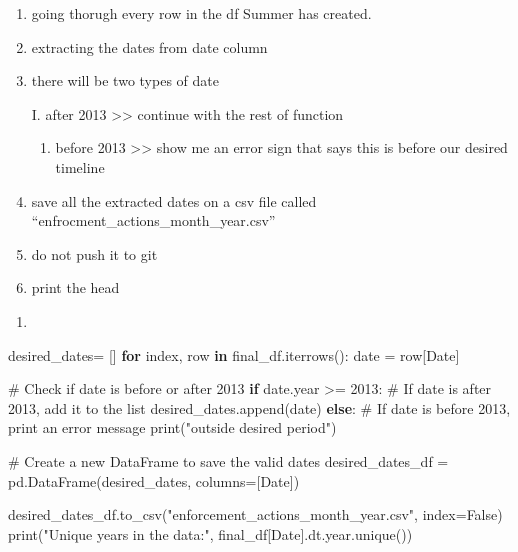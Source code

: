 \documentclass[
  letterpaper,
  DIV=11,
  numbers=noendperiod]{scrartcl}
\newenvironment{Shaded}{\begin{snugshade}}{\end{snugshade}}
\newcommand{\BuiltInTok}[1]{\textcolor[rgb]{0.00,0.23,0.31}{#1}}
\newcommand{\CommentTok}[1]{\textcolor[rgb]{0.37,0.37,0.37}{#1}}
\newcommand{\ControlFlowTok}[1]{\textcolor[rgb]{0.00,0.23,0.31}{\textbf{#1}}}
\newcommand{\DecValTok}[1]{\textcolor[rgb]{0.68,0.00,0.00}{#1}}
\newcommand{\KeywordTok}[1]{\textcolor[rgb]{0.00,0.23,0.31}{\textbf{#1}}}
\newcommand{\NormalTok}[1]{\textcolor[rgb]{0.00,0.23,0.31}{#1}}
\newcommand{\OperatorTok}[1]{\textcolor[rgb]{0.37,0.37,0.37}{#1}}
\newcommand{\StringTok}[1]{\textcolor[rgb]{0.13,0.47,0.30}{#1}}
\newcommand{\VariableTok}[1]{\textcolor[rgb]{0.07,0.07,0.07}{#1}}
\providecommand{\tightlist}{%
  \setlength{\itemsep}{0pt}\setlength{\parskip}{0pt}}\usepackage{longtable,booktabs,array}
\begin{document}
\begin{enumerate}
\def\labelenumi{\arabic{enumi}.}
\item
  going thorugh every row in the df Summer has created.
\item
  extracting the dates from date column
\item
  there will be two types of date

  I. after 2013 \textgreater\textgreater{} continue with the rest of
  function

  \begin{enumerate}
  \def\labelenumii{\Roman{enumii}.}
  \setcounter{enumii}{1}
  \tightlist
  \item
    before 2013 \textgreater\textgreater{} show me an error sign that
    says this is before our desired timeline
  \end{enumerate}
\item
  save all the extracted dates on a csv file called
  ``enfrocment\_actions\_month\_year.csv''
\item
  do not push it to git
\item
  print the head
\end{enumerate}

\begin{enumerate}
\def\labelenumi{\alph{enumi}.}
\setcounter{enumi}{1}
\tightlist
\item
\end{enumerate}

\begin{Shaded}
\begin{Highlighting}[]
\NormalTok{desired\_dates}\OperatorTok{=}\NormalTok{ []}
\ControlFlowTok{for}\NormalTok{ index, row }\KeywordTok{in}\NormalTok{ final\_df.iterrows():}
\NormalTok{    date }\OperatorTok{=}\NormalTok{ row[}\StringTok{\textquotesingle{}Date\textquotesingle{}}\NormalTok{]}
    
    \CommentTok{\# Check if date is before or after 2013}
    \ControlFlowTok{if}\NormalTok{ date.year }\OperatorTok{\textgreater{}=} \DecValTok{2013}\NormalTok{:}
        \CommentTok{\# If date is after 2013, add it to the list}
\NormalTok{        desired\_dates.append(date)}
    \ControlFlowTok{else}\NormalTok{:}
        \CommentTok{\# If date is before 2013, print an error message}
        \BuiltInTok{print}\NormalTok{(}\StringTok{"outside desired period"}\NormalTok{)}

\CommentTok{\# Create a new DataFrame to save the valid dates}
\NormalTok{desired\_dates\_df }\OperatorTok{=}\NormalTok{ pd.DataFrame(desired\_dates, columns}\OperatorTok{=}\NormalTok{[}\StringTok{\textquotesingle{}Date\textquotesingle{}}\NormalTok{])}

\NormalTok{desired\_dates\_df.to\_csv(}\StringTok{"enforcement\_actions\_month\_year.csv"}\NormalTok{, index}\OperatorTok{=}\VariableTok{False}\NormalTok{)}
\BuiltInTok{print}\NormalTok{(}\StringTok{"Unique years in the data:"}\NormalTok{, final\_df[}\StringTok{\textquotesingle{}Date\textquotesingle{}}\NormalTok{].dt.year.unique())}
\end{Highlighting}
\end{Shaded}
\end{document}
